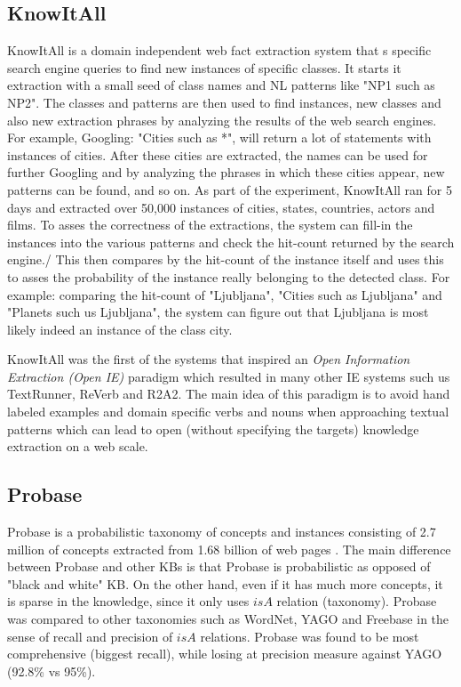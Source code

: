 \subsection{KnowItAll}
\label{section:r:knowitall}
KnowItAll\parencite{Etzioni2004} is a domain independent web fact extraction 
system that s specific search engine queries to find new instances of specific
classes. It starts it extraction with a small seed of class names and NL patterns
like "NP1 such as NP2". The classes and patterns are then used to find instances,
new classes and also new extraction phrases by analyzing the results of the 
web search engines. For example, Googling: "Cities such as *", will return 
a lot of statements with instances of cities. After these cities are extracted,
the names can be used for further Googling and by analyzing the phrases in which
these cities appear, new patterns can be found, and so on. As part of the
experiment, KnowItAll ran for 5 days and extracted over 50,000 instances of
cities, states, countries, actors and films.
To asses the correctness of the extractions, the system can fill-in the instances
into the various patterns and check the hit-count returned by the search engine./
This then compares by the hit-count of the instance itself and uses this to
asses the probability of the instance really belonging to the detected class.
For example: comparing the hit-count of "Ljubljana", "Cities such as Ljubljana"
and "Planets such us Ljubljana", the system can figure out that Ljubljana is
most likely indeed an instance of the class city.

KnowItAll was the first of the systems that inspired an \emph{Open Information
Extraction (Open IE)} paradigm\parencite{Etzioni2011} which resulted in many 
other IE systems such us TextRunner, ReVerb and R2A2. The main idea of this
paradigm is to avoid hand labeled examples and domain specific verbs and nouns
when approaching textual patterns which can lead to open (without specifying the
targets) knowledge extraction on a web scale.

\subsection{Probase}
\label{section:r:probase}
Probase is a probabilistic taxonomy of concepts and instances consisting of
2.7 million of concepts extracted from 1.68 billion of web pages
\parencite{Wu2012}. The main difference between Probase and other KBs is that
Probase is probabilistic as opposed of "black and white" KB. On the other hand,
even if it has much more concepts, it is sparse in the knowledge, since it only
uses $isA$ relation (taxonomy). Probase was compared to other taxonomies such as
WordNet, YAGO and Freebase in the sense of recall and precision of $isA$ 
relations. Probase was found to be most comprehensive (biggest recall), while
losing at precision measure against YAGO (92.8\% vs 95\%). 

